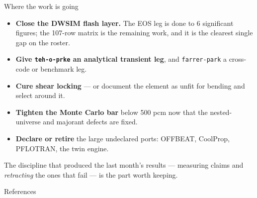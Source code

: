 \documentclass[aspectratio=169]{beamer}
\begin{document}
\begin{frame}{Where the work is going}
    \begin{itemize}
        \item \textbf{Close the DWSIM flash layer.} The EOS leg is done to 6
              significant figures; the 107-row matrix is the remaining work,
              and it is the clearest single gap on the roster.
        \item \textbf{Give \texttt{teh-o-prke} an analytical transient leg},
              and \texttt{farrer-park} a cross-code or benchmark leg.
        \item \textbf{Cure shear locking} --- or document the element as
              unfit for bending and select around it.
        \item \textbf{Tighten the Monte Carlo bar} below 500 pcm now that the
              nested-universe and majorant defects are fixed.
        \item \textbf{Declare or retire} the large undeclared ports:
              OFFBEAT, CoolProp, PFLOTRAN, the twin engine.
    \end{itemize}

    \medskip
    The discipline that produced the last month's results --- measuring claims
    and \emph{retracting} the ones that fail --- is the part worth keeping.
\end{frame}

\begin{frame}[allowframebreaks]{References}
    \printbibliography
\end{frame}
\end{document}
